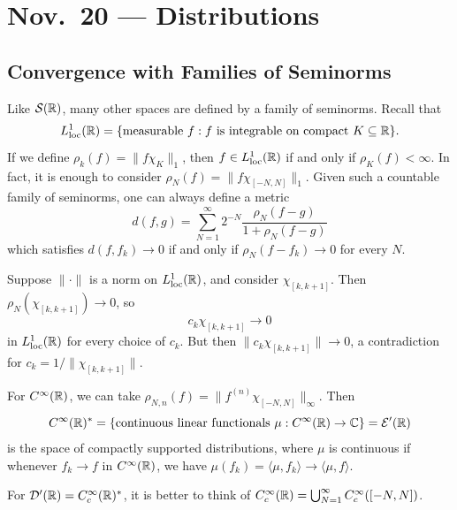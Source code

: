 \chapter{Nov.~20 --- Distributions}

\section{Convergence with Families of Seminorms}

\begin{example}
  Like $\mathcal{S}(\mathbb{R})$, many
  other spaces are defined by a
  family of seminorms. Recall that
  \[
    L^1_\mathrm{loc}(\mathbb{R})
    = \{
      \text{measurable } f : f \text{ is integrable on compact } K \subseteq \mathbb{R}
    \}.
  \]
  If we define $\rho_k(f) = \|f \chi_{K}\|_1$,
  then $f \in L^1_\mathrm{loc}(\mathbb{R})$
  if and only if
  $\rho_K(f) < \infty$. In fact,
  it is enough to consider
  $\rho_N(f) = \|f \chi_{[-N, N]}\|_1$.
  Given such a countable family
  of seminorms,
  one can always define a metric
  \[
    d(f, g)
    = \sum_{N=1}^\infty 2^{-N} \frac{\rho_N(f-g)}{1 + \rho_N(f-g)}
  \]
  which satisfies $d(f, f_k) \to 0$
  if and only if $\rho_N(f - f_k) \to 0$
  for every $N$.
\end{example}

\begin{remark}
  Suppose $\|\cdot\|$ is a norm
  on $L^1_\mathrm{loc}(\mathbb{R})$, and
  consider $\chi_{[k, k + 1]}$.
  Then $\rho_N(\chi_{[k, k + 1]}) \to 0$, so
  \[
    c_k \chi_{[k, k + 1]} \longrightarrow 0
  \]
  in $L^1_\mathrm{loc}(\mathbb{R})$
  for every choice of
  $c_k$. But then
  $\|c_k \chi_{[k, k + 1]}\| \to 0$,
  a contradiction for
  $c_k = 1 / \|\chi_{[k, k + 1]}\|$.
\end{remark}

\begin{example}
  For $C^\infty(\mathbb{R})$, we can take
  $\rho_{N, n}(f) = \|f^{(n)}\chi_{[-N, N]}\|_\infty$.
  Then
  \[
    C^\infty(\mathbb{R})^*
    = \{
      \text{continuous linear functionals }
      \mu : C^\infty(\mathbb{R}) \to \mathbb{C}
    \}
    = \mathcal{E}'(\mathbb{R})
  \]
  is the space of compactly
  supported distributions, where
  $\mu$ is continuous if whenever
  $f_k \to f$ in $C^\infty(\mathbb{R})$,
  we have $\mu(f_k) = \langle \mu, f_k \rangle \to \langle \mu, f \rangle$.
\end{example}

\begin{remark}
  For $\mathcal{D}'(\mathbb{R}) = C_c^\infty(\mathbb{R})^*$,
  it is better to think of
  $C^\infty_c(\mathbb{R}) = \bigcup_{N=1}^\infty C_c^\infty([-N, N])$.
\end{remark}

